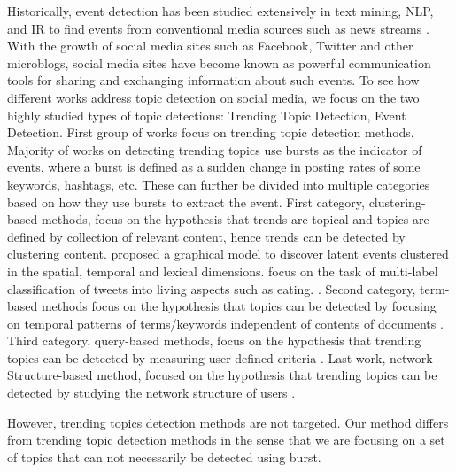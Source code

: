 \documentclass[letterpaper]{article}
\begin{document}
Historically, event detection has been studied extensively in text mining, NLP, and IR to find events from conventional media sources such as news streams \cite{yang}. With the growth of social media sites such as Facebook, Twitter and other microblogs, social media sites have become known as powerful communication tools for sharing and exchanging information about such events. To see how different works address topic detection on social media, we focus on the two highly studied types of topic detections: Trending Topic Detection, Event Detection.
First group of works focus on trending topic detection methods. Majority of works on detecting trending topics use bursts as the indicator of events, where a burst is defined as a sudden change in posting rates of some keywords, hashtags, etc. These can further be divided into multiple categories based on how they use bursts to extract the event. First category, clustering-based methods, focus on the hypothesis that trends are topical and topics are defined by collection of relevant content, hence trends can be detected by clustering content. \cite{wei} proposed a graphical model to discover latent events clustered in the spatial, temporal and lexical dimensions. \cite{yamamoto} focus on the task of multi-label classification of tweets into living aspects such as eating.%
 \cite{petrovic,ishikawa,murata,becker,tweetmotif,wangLee}. Second category, term-based methods focus on the hypothesis that topics can be detected by focusing on temporal patterns of terms/keywords independent of contents of documents \cite{mathioudakis,cuiZhang,zhaoSports,nichols}. Third category, query-based methods, focus on the hypothesis that trending topics can be detected by measuring user-defined criteria \cite{albakour,sakakiDrive}. Last work, network Structure-based method, focused on the hypothesis that trending topics can be detected by studying the network structure of users \cite{budak}.

However, trending topics detection methods are not targeted. Our method differs from trending topic detection methods in the sense that we are focusing on a set of topics that can not necessarily be detected using burst.
\end{document}
